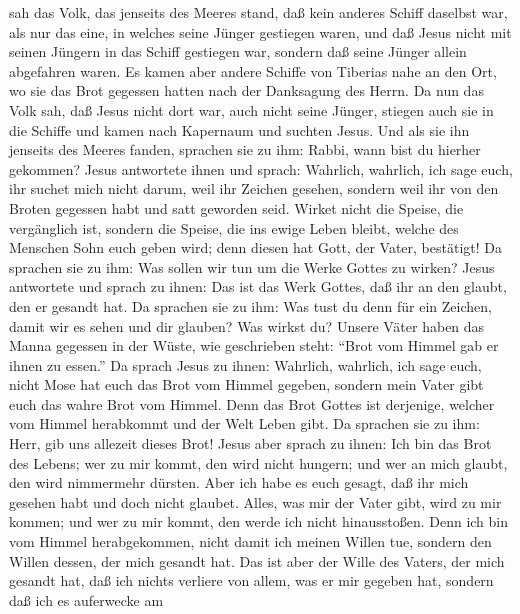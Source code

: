 sah das Volk, das jenseits des Meeres stand, daß kein anderes Schiff
daselbst war, als nur das eine, in welches seine Jünger gestiegen waren,
und daß Jesus nicht mit seinen Jüngern in das Schiff gestiegen war,
sondern daß seine Jünger allein abgefahren waren.  Es
kamen aber andere Schiffe von Tiberias nahe an den Ort, wo sie das Brot
gegessen hatten nach der Danksagung des Herrn.  Da nun
das Volk sah, daß Jesus nicht dort war, auch nicht seine Jünger, stiegen
auch sie in die Schiffe und kamen nach Kapernaum und suchten Jesus.
 Und als sie ihn jenseits des Meeres fanden, sprachen sie
zu ihm: Rabbi, wann bist du hierher gekommen?  Jesus
antwortete ihnen und sprach: Wahrlich, wahrlich, ich sage euch, ihr
suchet mich nicht darum, weil ihr Zeichen gesehen, sondern weil ihr von
den Broten gegessen habt und satt geworden seid.  Wirket
nicht die Speise, die vergänglich ist, sondern die Speise, die ins ewige
Leben bleibt, welche des Menschen Sohn euch geben wird; denn diesen hat
Gott, der Vater, bestätigt!  Da sprachen sie zu ihm: Was
sollen wir tun um die Werke Gottes zu wirken?  Jesus
antwortete und sprach zu ihnen: Das ist das Werk Gottes, daß ihr an den
glaubt, den er gesandt hat.  Da sprachen sie zu ihm: Was
tust du denn für ein Zeichen, damit wir es sehen und dir glauben? Was
wirkst du?  Unsere Väter haben das Manna gegessen in der
Wüste, wie geschrieben steht: ``Brot vom Himmel gab er ihnen zu essen.''
 Da sprach Jesus zu ihnen: Wahrlich, wahrlich, ich sage
euch, nicht Mose hat euch das Brot vom Himmel gegeben, sondern mein
Vater gibt euch das wahre Brot vom Himmel.  Denn das Brot
Gottes ist derjenige, welcher vom Himmel herabkommt und der Welt Leben
gibt.  Da sprachen sie zu ihm: Herr, gib uns allezeit
dieses Brot!  Jesus aber sprach zu ihnen: Ich bin das
Brot des Lebens; wer zu mir kommt, den wird nicht hungern; und wer an
mich glaubt, den wird nimmermehr dürsten.  Aber ich habe
es euch gesagt, daß ihr mich gesehen habt und doch nicht glaubet.
 Alles, was mir der Vater gibt, wird zu mir kommen; und
wer zu mir kommt, den werde ich nicht hinausstoßen.  Denn
ich bin vom Himmel herabgekommen, nicht damit ich meinen Willen tue,
sondern den Willen dessen, der mich gesandt hat.  Das ist
aber der Wille des Vaters, der mich gesandt hat, daß ich nichts verliere
von allem, was er mir gegeben hat, sondern daß ich es auferwecke am
